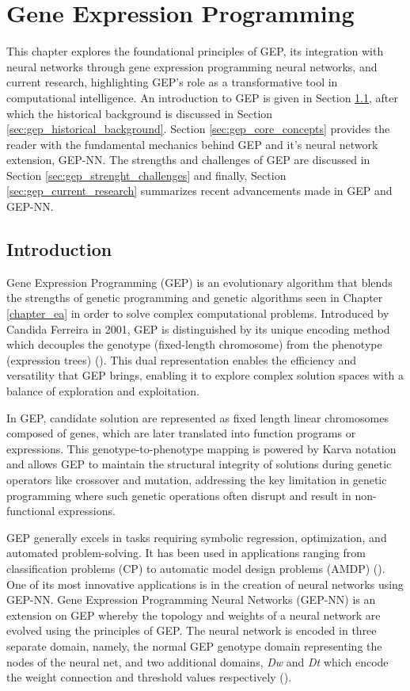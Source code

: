\chapter{Gene Expression Programming}\label{chapter:gep}
This chapter explores the foundational principles of GEP, its integration with neural networks through gene expression programming neural networks, and current research, highlighting GEP's role as a transformative tool in computational intelligence. An introduction to GEP is given in Section \ref{sec:gep_introduction}, after which the historical background is discussed in Section \ref{sec:gep_historical_background}. Section \ref{sec:gep_core_concepts} provides the reader with the fundamental mechanics behind GEP and it's neural network extension, GEP-NN. The strengths and challenges of GEP are discussed in Section \ref{sec:gep_strenght_challenges} and finally, Section \ref{sec:gep_current_research} summarizes recent advancements made in GEP and GEP-NN.


\section{Introduction}\label{sec:gep_introduction}
Gene Expression Programming (GEP) is an evolutionary algorithm that blends the strengths of genetic programming and genetic algorithms seen in Chapter \ref{chapter_ea} in order to solve complex computational problems. Introduced by Candida Ferreira in 2001, GEP is distinguished by its unique encoding method which decouples the genotype (fixed-length chromosome) from the phenotype (expression trees) (\cite{ferreira2006gene}). This dual representation enables the efficiency and versatility that GEP brings, enabling it to explore complex solution spaces with a balance of exploration and exploitation.

\parbreak\noindent In GEP, candidate solution are represented as fixed length linear chromosomes composed of genes, which are later translated into function programs or expressions. This genotype-to-phenotype mapping is powered by Karva notation and allows GEP to maintain the structural integrity of solutions during  genetic operators like crossover and mutation, addressing the key limitation in genetic programming where such genetic operations often disrupt and result in non-functional expressions.

\parbreak\noindent GEP generally excels in tasks requiring symbolic regression, optimization, and automated problem-solving. It has been used in applications ranging from classification problems (CP) to automatic model design problems (AMDP) (\cite{zhong2017gene}). One of its most innovative applications is in the creation of neural networks using GEP-NN. Gene Expression Programming Neural Networks (GEP-NN) is an extension on GEP whereby the topology and weights of a neural network are evolved using the principles of GEP. The neural network is encoded in three separate domain, namely, the normal GEP genotype domain representing the nodes of the neural net, and two additional domains, \textit{Dw} and \textit{Dt} which encode the weight connection and threshold values respectively (\cite{ferreira2006gene}).

